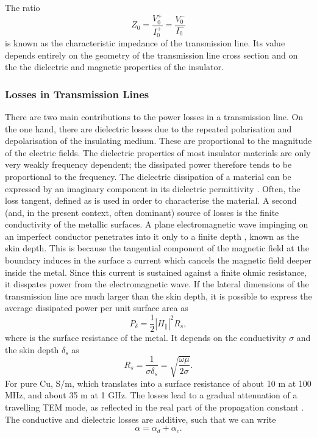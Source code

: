 The ratio
%
\begin{equation}
Z_0 = \frac{V_0^+}{I_0^+} = \frac{V_0^-}{I_0^-}
\end{equation}
%
is known as the characteristic impedance of the transmission line. Its
value depends entirely on the geometry of the transmission line cross
section and on the the dielectric and magnetic properties of the
insulator.



\subsubsection{Losses in Transmission
Lines}\label{losses-in-transmission-lines}

There are two main contributions to the power losses in a transmission
line. On the one hand, there are dielectric losses due to the repeated
polarisation and depolarisation of the insulating medium. These are
proportional to the magnitude of the electric fields. The dielectric
properties of most insulator materials are only very weakly frequency
dependent; the dissipated power therefore tends to be proportional to
the frequency. The dielectric dissipation of a material can be expressed
by an imaginary component in its dielectric permittivity
. Often, the loss tangent, defined
as  is used in order to characterise
the material. A second (and, in the present context, often
dominant) source of losses is the finite conductivity of the metallic surfaces.
A plane electromagnetic wave impinging on an imperfect
conductor penetrates into it only to a finite depth , known as
the skin depth. This is because the tangential component of the magnetic
field at the boundary induces in the surface a current which cancels the
magnetic field deeper inside the metal. Since this current is sustained
against a finite ohmic resistance, it disspates power from the electromagnetic wave. 
If the lateral dimensions of the transmission line are much larger
than the skin depth, it is possible to express the average dissipated power per
unit surface area as
%
\begin{equation}
P_\delta = \frac{1}{2}|H_\parallel|^2 R_s,
\end{equation}
%
where  is the surface resistance of the metal. It depends on the
conductivity $\sigma$ and the skin depth $\delta_s$ as
%
\begin{equation}
R_s = \frac{1}{\sigma \delta_s} = \sqrt{\frac{\omega\mu}{2\sigma}}.
\end{equation}
%
For pure Cu, S/m, which translates
into a surface resistance of about 10 m\m{\Omega} at 100 MHz, and about
35 m\m{\Omega} at 1 GHz. The losses lead to a gradual attenuation of a
travelling TEM mode, as reflected in the real part of the propagation
constant \m{\gamma}. The conductive and dielectric losses are additive,
such that we can write
%
\begin{equation}
\alpha = \alpha_d + \alpha_c.
\end{equation}


